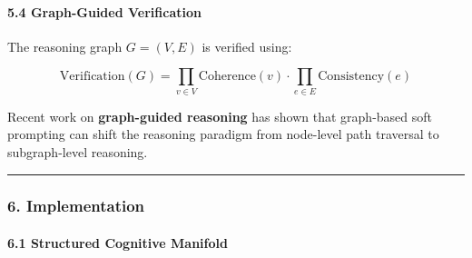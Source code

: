 \documentclass[
  11pt,
  a4paper,
]{article}
\begin{document}
\paragraph{5.4 Graph-Guided
Verification}\label{graph-guided-verification}

The reasoning graph \(G = (V, E)\) is verified using:

\[
\text{Verification}(G) = \prod_{v \in V} \text{Coherence}(v) \cdot \prod_{e \in E} \text{Consistency}(e)
\]

Recent work on \textbf{graph-guided reasoning} has shown that
graph-based soft prompting can shift the reasoning paradigm from
node-level path traversal to subgraph-level reasoning.

\begin{center}\rule{0.5\linewidth}{0.5pt}\end{center}

\subsubsection{6. Implementation}\label{implementation-7}

\paragraph{6.1 Structured Cognitive
Manifold}\label{structured-cognitive-manifold-1}
\end{document}
